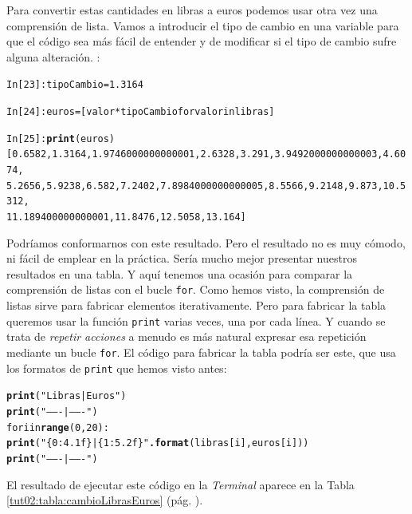 \documentclass[10pt,a4paper]{article}\usepackage[]{graphicx}\usepackage[]{color}
\makeatletter
\newcommand{\hlstr}[1]{\textcolor[rgb]{0.192,0.494,0.8}{#1}}%
\newcommand{\hlkwd}[1]{\textcolor[rgb]{0.737,0.353,0.396}{\textbf{#1}}}%
\newenvironment{kframe}{%
 \def\at@end@of@kframe{}%
 \ifinner\ifhmode%
  \def\at@end@of@kframe{\end{minipage}}%
  \begin{minipage}{\columnwidth}%
 \fi\fi%
 \def\FrameCommand##1{\hskip\@totalleftmargin \hskip-\fboxsep
 \colorbox{shadecolor}{##1}\hskip-\fboxsep
     \hskip-\linewidth \hskip-\@totalleftmargin \hskip\columnwidth}%
 \MakeFramed {\advance\hsize-\width
   \@totalleftmargin\z@ \linewidth\hsize
   \@setminipage}}%
 {\par\unskip\endMakeFramed%
 \at@end@of@kframe}
\newenvironment{knitrout}{}{} %
\makeatother
\begin{document}
Para convertir estas cantidades en libras a euros podemos usar otra vez una comprensión de lista. Vamos a introducir el tipo de cambio en una variable para que el código sea más fácil de entender y de modificar si el tipo de cambio sufre alguna alteración. :
\begin{knitrout}
\color{fgcolor}\begin{kframe}
\begin{alltt}
In [23]: tipoCambio = 1.3164

In [24]: euros = [valor * tipoCambio for valor in libras]

In [25]: \hlkwd{print}(euros)
[0.6582, 1.3164, 1.9746000000000001, 2.6328, 3.291, 3.9492000000000003, 4.6074,
5.2656, 5.9238, 6.582, 7.2402, 7.8984000000000005, 8.5566, 9.2148, 9.873, 10.5312,
11.189400000000001, 11.8476, 12.5058, 13.164]
\end{alltt}
\end{kframe}
\end{knitrout}
Podríamos conformarnos con este resultado. Pero el resultado no es muy cómodo, ni fácil de emplear en la práctica. Sería mucho mejor presentar nuestros resultados en una tabla. Y aquí tenemos una ocasión para comparar la comprensión de listas con el bucle {\tt for}. Como hemos visto, la comprensión de listas sirve para fabricar elementos iterativamente. Pero para fabricar la tabla queremos usar la función {\tt print} varias veces, una por cada línea. Y cuando se trata de {\em repetir acciones} a menudo es más natural expresar esa repetición  mediante un bucle {\tt for}. El código para fabricar la tabla podría ser este, que usa los formatos de {\tt print} que hemos visto antes:
\begin{knitrout}
\color{fgcolor}\begin{kframe}
\begin{alltt}
\hlkwd{print}(\hlstr{"Libras |  Euros"})
\hlkwd{print}(\hlstr{"-------|-------"})
for i in \hlkwd{range}(0, 20):
  \hlkwd{print}(\hlstr{" \{0:4.1f\}  |  \{1:5.2f\}"}\hlkwd{.format}(libras[i], euros[i]))
  \hlkwd{print}(\hlstr{"-------|-------"})
\end{alltt}
\end{kframe}
\end{knitrout}
El resultado de ejecutar este código en la {\em Terminal} aparece en la
Tabla \ref{tut02:tabla:cambioLibrasEuros} (pág. \pageref{tut02:tabla:cambioLibrasEuros}).
\end{document}
